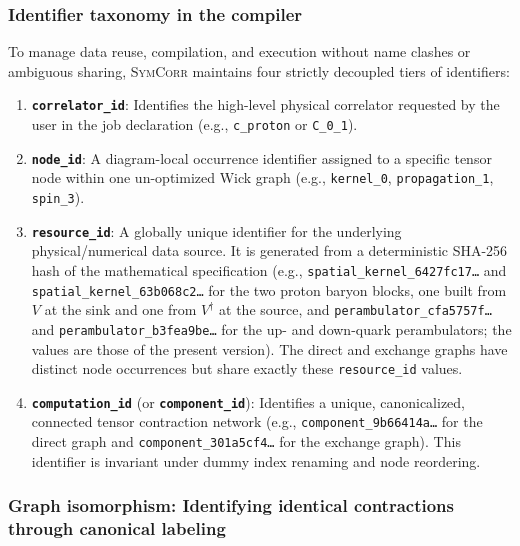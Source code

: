 \documentclass[a4paper,fleqn]{cas-dc}
\begin{document}
\FloatBarrier

\subsubsection{Identifier taxonomy in the compiler}
\label{sec:identifier_taxonomy}

To manage data reuse, compilation, and execution without name clashes or ambiguous sharing, \textsc{SymCorr} maintains four strictly decoupled tiers of identifiers:
\begin{enumerate}
    \item \textbf{\texttt{correlator\_id}}: Identifies the high-level physical correlator requested by the user in the job declaration (e.g., \texttt{c\_proton} or \texttt{C\_0\_1}).
    \item \textbf{\texttt{node\_id}}: A diagram-local occurrence identifier assigned to a specific tensor node within one un-optimized Wick graph (e.g., \texttt{kernel\_0}, \texttt{propagation\_1}, \texttt{spin\_3}).
    \item \textbf{\texttt{resource\_id}}: A globally unique identifier for the underlying physical/numerical data source. It is generated from a deterministic SHA-256 hash of the mathematical specification (e.g., \texttt{spatial\_kernel\_}\allowbreak\texttt{6427fc17\dots} and \texttt{spatial\_kernel\_}\allowbreak\texttt{63b068c2\dots} for the two proton baryon blocks, one built from $V$ at the sink and one from $V^\dagger$ at the source, and \texttt{perambulator\_}\allowbreak\texttt{cfa5757f\dots} and \texttt{perambulator\_}\allowbreak\texttt{b3fea9be\dots} for the up- and down-quark perambulators; the values are those of the present version). The direct and exchange graphs have distinct node occurrences but share exactly these \texttt{resource\_id} values.
    \item \textbf{\texttt{computation\_id}} (or \textbf{\texttt{component\_id}}): Identifies a unique, canonicalized, connected tensor contraction network (e.g., \texttt{component\_}\allowbreak\texttt{9b66414a\dots} for the direct graph and \texttt{component\_}\allowbreak\texttt{301a5cf4\dots} for the exchange graph). This identifier is invariant under dummy index renaming and node reordering.
\end{enumerate}

\subsubsection{Graph isomorphism: Identifying identical contractions through canonical labeling}
\label{sec:isomorphism_strategy}
\end{document}
